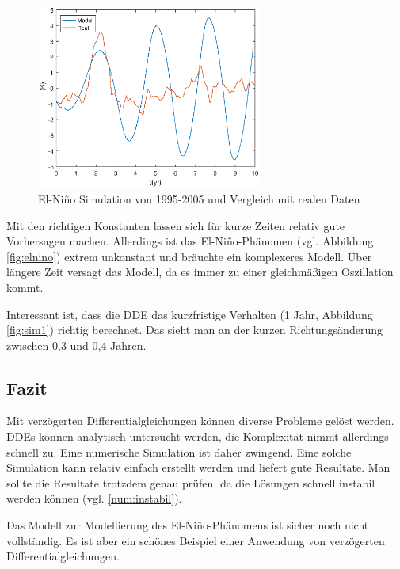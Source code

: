 \begin{figure}
	\centering
	\includegraphics[width=0.66\textwidth,height=0.33\textheight]{verzoegert/inp/figures/sim_10.eps}
	\caption{El-Niño Simulation von 1995-2005 und Vergleich mit realen Daten}
	\label{fig:sim10}
\end{figure}
Mit den richtigen Konstanten lassen sich für kurze Zeiten relativ gute Vorhersagen machen.
Allerdings ist das El-Niño-Phänomen (vgl. Abbildung \ref{fig:elnino}) extrem unkonstant und bräuchte ein komplexeres Modell.
Über längere Zeit versagt das Modell, da es immer zu einer gleichmäßigen Oszillation kommt.

Interessant ist, dass die DDE das kurzfristige Verhalten (1 Jahr, Abbildung \ref{fig:sim1}) richtig berechnet.
Das sieht man an der kurzen Richtungsänderung zwischen 0,3 und 0,4 Jahren.



\subsection{Fazit}
Mit verzögerten Differentialgleichungen können diverse Probleme gelöst werden.
DDEs können analytisch untersucht werden, die Komplexität nimmt allerdings schnell zu.
Eine numerische Simulation ist daher zwingend.
Eine solche Simulation kann relativ einfach erstellt werden und liefert gute Resultate.
Man sollte die Resultate trotzdem genau prüfen, da die Lösungen schnell instabil werden können (vgl. \ref{num:instabil}).

Das Modell zur Modellierung des El-Niño-Phänomens ist sicher noch nicht vollständig.
Es ist aber ein schönes Beispiel einer Anwendung von verzögerten Differentialgleichungen. 
